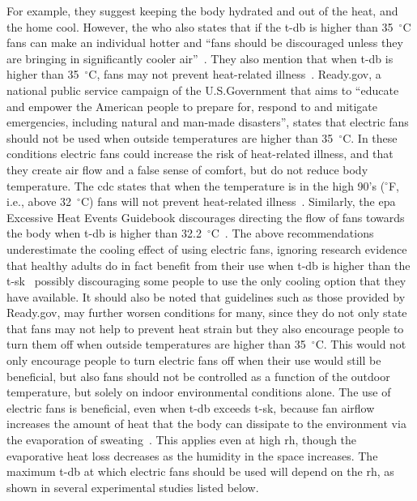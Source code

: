 For example, they suggest keeping the body hydrated and out of the heat, and the home cool.
However, the \ac{who} also states that if the \ac{t-db} is higher than 35~$^{\circ}$C fans can make an individual hotter and ``fans should be discouraged unless they are bringing in significantly cooler air''~\cite{WMO2015}.
They also mention that when \ac{t-db} is higher than 35~$^{\circ}$C, fans may not prevent heat-related illness~\cite{HeatandH28:online}.
Ready.gov, a national public service campaign of the U.S.\@ Government that aims to ``educate and empower the American people to prepare for, respond to and mitigate emergencies, including natural and man-made disasters'', states that electric fans should not be used when outside temperatures are higher than 35~$^{\circ}$C\@.
In these conditions electric fans could increase the risk of heat-related illness, and that they create air flow and a false sense of comfort, but do not reduce body temperature.
The \ac{cdc} states that when the temperature is in the high 90's ($^{\circ}$F, i.e., above 32~$^{\circ}$C) fans will not prevent heat-related illness~\cite{ExtremeH66:online}.
Similarly, the \ac{epa} Excessive Heat Events Guidebook discourages directing the flow of fans towards the body when \ac{t-db} is higher than 32.2~$^{\circ}$C~\cite{UnitedStatesEnvironmentalProtectionAgency2006}.
The above recommendations underestimate the cooling effect of using electric fans, ignoring research evidence that healthy adults do in fact benefit from their use when \ac{t-db} is higher than the \ac{t-sk}~\cite{Rate2015, Jay2015, Jay2019a, Rate2015, Gagnon2017} possibly discouraging some people to use the only cooling option that they have available.
It should also be noted that guidelines such as those provided by Ready.gov, may further worsen conditions for many, since they do not only state that fans may not help to prevent heat strain but they also encourage people to turn them off when outside temperatures are higher than 35~$^{\circ}$C\@.
This would not only encourage people to turn electric fans off when their use would still be beneficial, but also fans should not be controlled as a function of the outdoor temperature, but solely on indoor environmental conditions alone.
The use of electric fans is beneficial, even when \ac{t-db} exceeds \ac{t-sk}, because fan airflow increases the amount of heat that the body can dissipate to the environment via the evaporation of sweating~\cite{Jay2015}.
This applies even at high \ac{rh}, though the evaporative heat loss decreases as the humidity in the space increases.
The maximum \ac{t-db} at which electric fans should be used will depend on the \ac{rh}, as shown in several experimental studies listed below.

